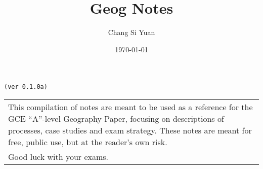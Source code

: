 \documentclass[../main]{subfiles}
\begin{document}
\author{Chang Si Yuan}
\title{Geog Notes}
\date{\today}

\maketitle

\begin{center}

	\texttt{(ver 0.1.0a)}

	\vspace{50pt}

	\begin{tabular}{>{\flushleft}p{8cm}}
	This compilation of notes are meant to be used as a reference for the GCE ``A''-level Geography Paper, focusing on descriptions of processes, case studies and exam strategy. These notes are meant for free, public use, but at the reader's own risk. \\
	Good luck with your exams.
	\end{tabular}

\end{center}

\newpage
\end{document}
